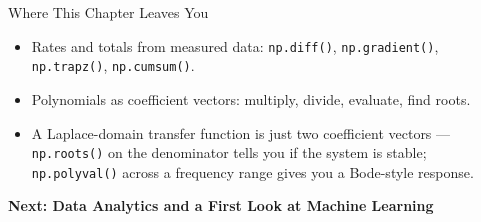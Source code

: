 \documentclass[9pt,aspectratio=169,xcolor=table]{beamer}
\begin{document}
\begin{frame}{Where This Chapter Leaves You}
    \leavevmode
    \small
    \begin{itemize}
        \item Rates and totals from \alert{measured data}: \texttt{np.diff()},
              \texttt{np.gradient()}, \texttt{np.trapz()},
              \texttt{np.cumsum()}.
        \item Polynomials as \alert{coefficient vectors}: multiply,
              divide, evaluate, find roots.
        \item A Laplace-domain transfer function is just \alert{two
              coefficient vectors} --- \texttt{np.roots()} on the
              denominator tells you if the system is stable;
              \texttt{np.polyval()} across a frequency range gives you
              a Bode-style response.
    \end{itemize}

    \vspace{4mm}
    \begin{center}
        \large\color{primary}\textbf{Next: Data Analytics and a First
        Look at Machine Learning}
    \end{center}
\end{frame}
\end{document}
